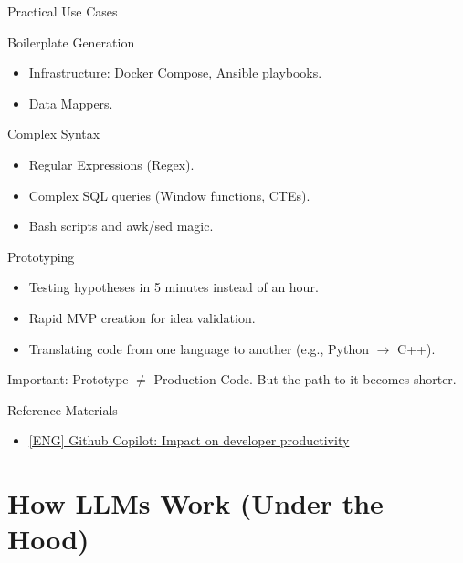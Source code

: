 \documentclass[aspectratio=169]{beamer}
\begin{document}
\begin{frame}[t]{Practical Use Cases}
    \begin{block}{Boilerplate Generation}
        \begin{itemize}
            \item Infrastructure: Docker Compose, Ansible playbooks.
            \item Data Mappers.
        \end{itemize}
    \end{block}
    \begin{block}{Complex Syntax}
        \begin{itemize}
            \item Regular Expressions (Regex).
            \item Complex SQL queries (Window functions, CTEs).
            \item Bash scripts and awk/sed magic.
        \end{itemize}
    \end{block}
\end{frame}

\begin{frame}[t]{Prototyping}
    \begin{itemize}
        \item Testing hypotheses in 5 minutes instead of an hour.
        \item Rapid MVP creation for idea validation.
        \item Translating code from one language to another (e.g., Python $\to$ C++).
    \end{itemize}
    \vspace{0.5cm}
    \alert{Important:} Prototype $\neq$ Production Code. But the path to it becomes shorter.
\end{frame}

\begin{frame}[t]{Reference Materials}
    \begin{itemize}
        \item \href{https://github.blog/news-insights/research/the-economic-impact-of-the-ai-powered-developer-lifecycle-and-lessons-from-github-copilot/}{[ENG] Github Copilot: Impact on developer productivity}
    \end{itemize}
    

\end{frame}

\section{How LLMs Work (Under the Hood)}
\end{document}
